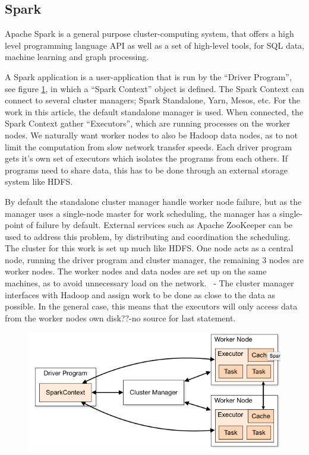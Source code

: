 \subsection{Spark}
Apache Spark is a general purpose cluster-computing system, that offers a high level programming language API as well as a set of high-level tools, for SQL data, machine learning and graph processing. ~\cite{sparkintro} 

A Spark application is a user-application that is run by the “Driver Program”, see figure \ref{fig:spark}, in which a “Spark Context” object is defined. The Spark Context can connect to several cluster managers; Spark Standalone, Yarn, Mesos, etc. For the work in this article, the default standalone manager is used. When connected, the Spark Context gather “Executors”, which are running processes on the worker nodes. We naturally want worker nodes to also be Hadoop data nodes, as to not limit the computation from slow network transfer speeds. Each driver program gets it’s own set of executors which isolates the programs from each others. If programs need to share data, this has to be done through an external storage system like HDFS.

By default the standalone cluster manager handle worker node failure, but as the manager uses a single-node master for work scheduling, the manager has a single-point of failure by default. External services such as Apache ZooKeeper can be used to address this problem, by distributing and coordination the scheduling. The cluster for this work is set up much like HDFS. One node acts as a central node, running the driver program and cluster manager, the remaining 3 nodes are worker nodes. The worker nodes and data nodes are set up on the same machines, as to avoid unnecessary load on the network.~\cite{sparkcluster} - The cluster manager interfaces with Hadoop and assign work to be done as close to the data as possible. In the general case, this means that the executors will only access data from the worker nodes own disk??-no source for last statement.

\begin{figure}	
	\includegraphics[width=\textwidth]{cluster/images/sparkoverview.png} 
	\label{fig:spark} 
\end{figure}
